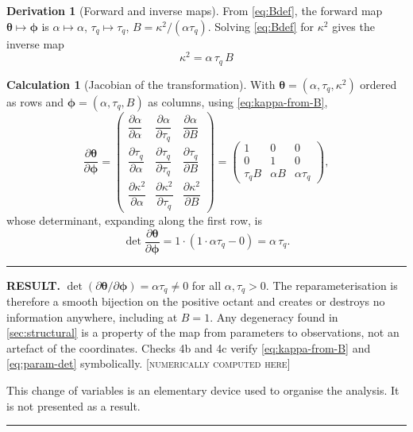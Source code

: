 \documentclass[11pt,a4paper]{article}
\theoremstyle{definition}
\newtheorem{derivationx}{Derivation}[section]
\newtheorem{calculationx}{Calculation}[section]
\newenvironment{resultbox}%
  {\par\medskip\noindent\begin{minipage}{\linewidth}%
   \rule{\linewidth}{1.0pt}\par\noindent\textbf{RESULT.}\enspace}%
  {\par\rule{\linewidth}{1.0pt}\end{minipage}\par\medskip}
\newcommand{\NUM}{\textcolor{red!55!black}{\footnotesize[\textsc{numerically computed here}]}}
\newcommand{\tq}{\tau_{q}}
\newcommand{\kk}{\kappa^{2}}
\newcommand{\Bnum}{B}
\begin{document}
\begin{derivationx}[Forward and inverse maps]
\label{der:maps}
From \eqref{eq:Bdef}, the forward map $\bm{\theta}\mapsto\bm{\phi}$ is
$\alpha\mapsto\alpha$, $\tq\mapsto\tq$, $\Bnum=\kk/(\alpha\tq)$. Solving
\eqref{eq:Bdef} for $\kk$ gives the inverse map
\begin{equation}
  \boxed{\ \kk = \alpha\,\tq\,\Bnum\ }
  \label{eq:kappa-from-B}
\end{equation}
\end{derivationx}

\begin{calculationx}[Jacobian of the transformation]
\label{calc:jac-param}
With $\bm{\theta}=(\alpha,\tq,\kk)$ ordered as rows and
$\bm{\phi}=(\alpha,\tq,\Bnum)$ as columns, using \eqref{eq:kappa-from-B},
\begin{equation}
  \frac{\partial\bm{\theta}}{\partial\bm{\phi}}
  =
  \begin{pmatrix}
    \dfrac{\partial\alpha}{\partial\alpha} &
    \dfrac{\partial\alpha}{\partial\tq} &
    \dfrac{\partial\alpha}{\partial\Bnum} \\[1.6ex]
    \dfrac{\partial\tq}{\partial\alpha} &
    \dfrac{\partial\tq}{\partial\tq} &
    \dfrac{\partial\tq}{\partial\Bnum} \\[1.6ex]
    \dfrac{\partial\kk}{\partial\alpha} &
    \dfrac{\partial\kk}{\partial\tq} &
    \dfrac{\partial\kk}{\partial\Bnum}
  \end{pmatrix}
  =
  \begin{pmatrix}
    1 & 0 & 0 \\
    0 & 1 & 0 \\
    \tq\Bnum & \alpha\Bnum & \alpha\tq
  \end{pmatrix} ,
  \label{eq:param-jacobian}
\end{equation}
whose determinant, expanding along the first row, is
\begin{equation}
  \det\frac{\partial\bm{\theta}}{\partial\bm{\phi}}
   = 1\cdot\left(1\cdot\alpha\tq - 0\right) = \alpha\,\tq .
  \label{eq:param-det}
\end{equation}
\end{calculationx}

\begin{resultbox}
$\det(\partial\bm{\theta}/\partial\bm{\phi})=\alpha\tq\neq0$ for all
$\alpha,\tq>0$. The reparameterisation is therefore a smooth bijection on the
positive octant and creates or destroys no information anywhere, including at
$\Bnum=1$. Any degeneracy found in \cref{sec:structural} is a property of the
map from parameters to observations, not an artefact of the coordinates.
Checks 4b and 4c verify \eqref{eq:kappa-from-B} and \eqref{eq:param-det}
symbolically. \NUM

This change of variables is an elementary device used to organise the analysis.
It is not presented as a result.
\end{resultbox}
\end{document}

